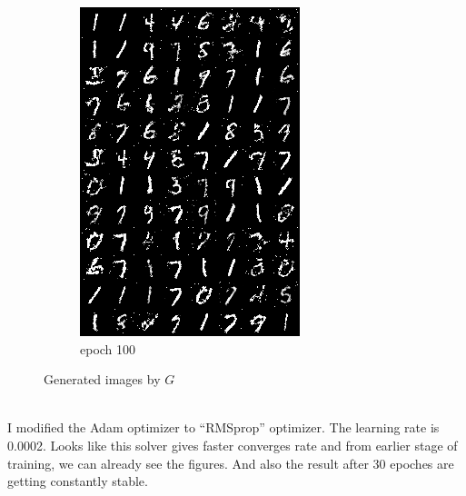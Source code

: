 \documentclass[a4paper]{article}
\theoremstyle{definition}
\newenvironment{soln}{
	\leavevmode\color{blue}\ignorespaces
}{}
\begin{document}
\begin{enumerate} [label=(\alph*)]
\begin{figure}[H]
\begin{subfigure}[b]{0.28\textwidth}
				\includegraphics[width=\textwidth]{gen_img100.png}
				\caption{epoch 100}
			\end{subfigure}
			\caption{Generated images by $G$}
			\label{fig:threegraphs_q1c}
		\end{figure}


		\begin{soln}  \\
		I modified the Adam optimizer to ``RMSprop'' optimizer. The learning rate is 0.0002. Looks like this solver gives faster converges rate and from earlier stage of training, we can already see the figures. And also the result after 30 epoches are getting constantly stable.\\
		\end{soln}
		
	\end{enumerate}
\end{document}

